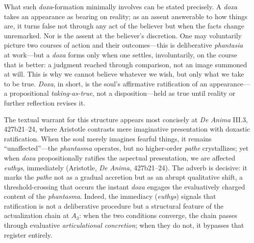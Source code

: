 \documentclass{article}
\begin{document}
What such \textit{doxa}-formation minimally involves can be stated precisely. A \textit{doxa} takes an appearance as bearing on reality; as an assent answerable to how things are, it turns false not through any act of the believer but when the facts change unremarked. Nor is the assent at the believer's discretion. One may voluntarily picture two courses of action and their outcomes---this is deliberative \textit{phantasia} at work---but a \textit{doxa} forms only when one settles, involuntarily, on the course that is better: a judgment reached through comparison, not an image summoned at will. This is why we cannot believe whatever we wish, but only what we take to be true. \textit{Doxa}, in short, is the soul's affirmative ratification of an appearance---a propositional \textit{taking-as-true}, not a disposition---held as true until reality or further reflection revises it.

The textual warrant for this structure appears most concisely at \textit{De Anima} III.3, 427b21--24, where Aristotle contrasts mere imaginative presentation with doxastic ratification. When the soul merely imagines fearful things, it remains ``unaffected''---the \textit{phantasma} operates, but no higher-order \textit{pathe} crystallizes; yet when \textit{doxa} propositionally ratifies the aspectual presentation, we are affected \textit{euthys}, immediately (Aristotle, \textit{De Anima}, 427b21--24). The adverb is decisive: it marks the \textit{pathe} not as a gradual accretion but as an abrupt qualitative shift, a threshold-crossing that occurs the instant \textit{doxa} engages the evaluatively charged content of the \textit{phantasma}. Indeed, the immediacy (\textit{euthys}) signals that ratification is not a deliberative procedure but a structural feature of the actualization chain at $A_3$: when the two conditions converge, the chain passes through evaluative \textit{articulational concretion}; when they do not, it bypasses that register entirely.
\end{document}
